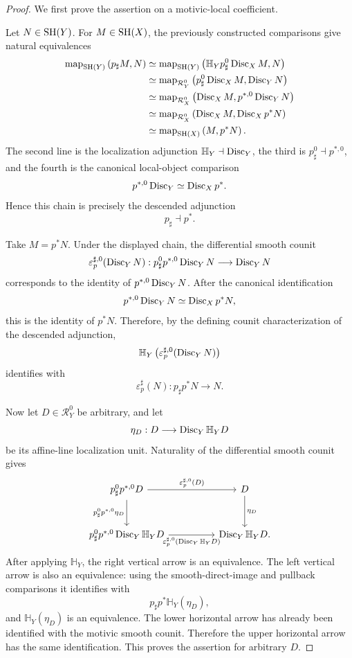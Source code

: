 \begin{proof}
We first prove the assertion on a motivic-local coefficient.

Let \(N\in\mathrm{SH}(Y)\).  For \(M\in\mathrm{SH}(X)\), the previously constructed
comparisons give natural equivalences
\[
\begin{aligned}
    \operatorname{map}_{\mathrm{SH}(Y)}
    \left(
        p_\sharp M,N
    \right)
    &\simeq
    \operatorname{map}_{\mathrm{SH}(Y)}
    \left(
        \mathbb H_Yp_\sharp^0\operatorname{Disc}_XM,N
    \right)
    \\
    &\simeq
    \operatorname{map}_{\mathcal R_Y^0}
    \left(
        p_\sharp^0\operatorname{Disc}_XM,\operatorname{Disc}_YN
    \right)
    \\
    &\simeq
    \operatorname{map}_{\mathcal R_X^0}
    \left(
        \operatorname{Disc}_XM,p^{*,0}\operatorname{Disc}_YN
    \right)
    \\
    &\simeq
    \operatorname{map}_{\mathcal R_X^0}
    \left(
        \operatorname{Disc}_XM,\operatorname{Disc}_Xp^*N
    \right)
    \\
    &\simeq
    \operatorname{map}_{\mathrm{SH}(X)}
    \left(
        M,p^*N
    \right).
\end{aligned}
\]
The second line is the localization adjunction
\(\mathbb H_Y\dashv\operatorname{Disc}_Y\), the third is
\(p_\sharp^0\dashv p^{*,0}\), and the fourth is the canonical
local-object comparison
\[
    p^{*,0}\operatorname{Disc}_Y
    \simeq
    \operatorname{Disc}_Xp^*.
\]
Hence this chain is precisely the descended adjunction
\[
    p_\sharp\dashv p^*.
\]

Take \(M=p^*N\).  Under the displayed chain, the differential smooth
counit
\[
    \varepsilon_p^{\sharp,0}(\operatorname{Disc}_YN):
    p_\sharp^0p^{*,0}\operatorname{Disc}_YN
    \longrightarrow
    \operatorname{Disc}_YN
\]
corresponds to the identity of
\(p^{*,0}\operatorname{Disc}_YN\).  After the canonical identification
\[
    p^{*,0}\operatorname{Disc}_YN
    \simeq
    \operatorname{Disc}_Xp^*N,
\]
this is the identity of \(p^*N\).  Therefore, by the defining
counit characterization of the descended adjunction,
\[
    \mathbb H_Y
    \left(
        \varepsilon_p^{\sharp,0}(\operatorname{Disc}_YN)
    \right)
\]
identifies with
\[
    \varepsilon_p^\sharp(N):
    p_\sharp p^*N\longrightarrow N.
\]

Now let \(D\in\mathcal R_Y^0\) be arbitrary, and let
\[
    \eta_D:
    D\longrightarrow
    \operatorname{Disc}_Y\mathbb H_YD
\]
be its affine-line localization unit.  Naturality of the differential
smooth counit gives
\[
\begin{tikzcd}[column sep=huge,row sep=large]
    p_\sharp^0p^{*,0}D
        \ar[r,"\varepsilon_p^{\sharp,0}(D)"]
        \ar[d,"p_\sharp^0p^{*,0}\eta_D"']
    &
    D
        \ar[d,"\eta_D"]
    \\
    p_\sharp^0p^{*,0}\Disc_Y\mathbb H_YD
        \ar[r,"\varepsilon_p^{\sharp,0}(\Disc_Y\mathbb H_YD)"']
    &
    \Disc_Y\mathbb H_YD.
\end{tikzcd}
\]
After applying \(\mathbb H_Y\), the right vertical arrow is an
equivalence.  The left vertical arrow is also an equivalence: using the
smooth-direct-image and pullback comparisons it identifies with
\[
    p_\sharp p^*\mathbb H_Y(\eta_D),
\]
and \(\mathbb H_Y(\eta_D)\) is an equivalence.  The lower horizontal
arrow has already been identified with the motivic smooth counit.
Therefore the upper horizontal arrow has the same identification.  This
proves the assertion for arbitrary \(D\).
\end{proof}

